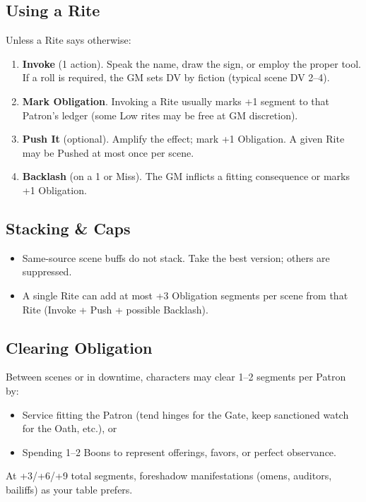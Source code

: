 \subsection*{Using a Rite}

Unless a Rite says otherwise:
\begin{enumerate}
    \item \textbf{Invoke} (1 action). Speak the name, draw the sign, or employ the proper tool. If a roll is required, the GM sets DV by fiction (typical scene DV 2--4).
    \item \textbf{Mark Obligation}. Invoking a Rite usually marks +1 segment to that Patron's ledger (some Low rites may be free at GM discretion).
    \item \textbf{Push It} (optional). Amplify the effect; mark +1 Obligation. A given Rite may be Pushed at most once per scene.
    \item \textbf{Backlash} (on a 1 or Miss). The GM inflicts a fitting consequence or marks +1 Obligation.
\end{enumerate}

\subsection*{Stacking \& Caps}

\begin{itemize}
    \item Same-source scene buffs do not stack. Take the best version; others are suppressed.
    \item A single Rite can add at most +3 Obligation segments per scene from that Rite (Invoke + Push + possible Backlash).
\end{itemize}

\subsection*{Clearing Obligation}

Between scenes or in downtime, characters may clear 1--2 segments per Patron by:
\begin{itemize}
    \item Service fitting the Patron (tend hinges for the Gate, keep sanctioned watch for the Oath, etc.), or
    \item Spending 1--2 Boons to represent offerings, favors, or perfect observance.
\end{itemize}
At +3/+6/+9 total segments, foreshadow manifestations (omens, auditors, bailiffs) as your table prefers.


